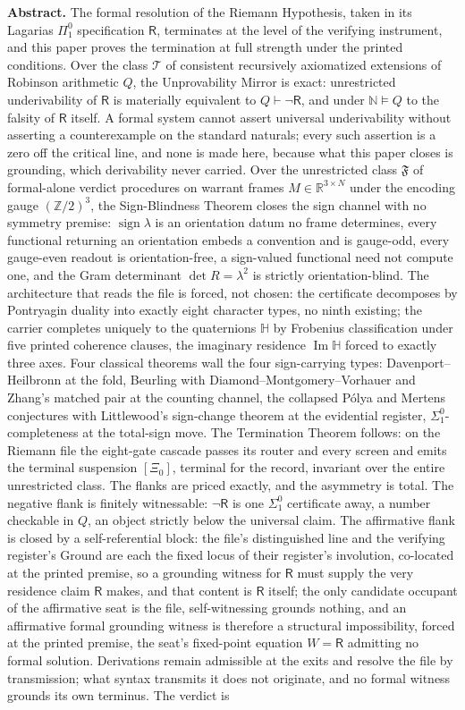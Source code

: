 \documentclass[twocolumn,10pt]{article}
\theoremstyle{plain}
\theoremstyle{definition}
\newcommand{\tXi}{[\Xi_0]}
\newcommand{\R}{\mathsf{R}}
\newcommand{\N}{\mathbb{N}}
\newcommand{\Rl}{\mathbb{R}}
\newcommand{\Hq}{\mathbb{H}}
\newcommand{\Fr}{\mathfrak{F}}
\begin{document}
{\noindent\textbf{Abstract.} The formal resolution of the Riemann Hypothesis, taken in its Lagarias $\Pi^0_1$ specification $\R$, terminates at the level of the verifying instrument, and this paper proves the termination at full strength under the printed conditions. Over the class $\mathcal T$ of consistent recursively axiomatized extensions of Robinson arithmetic $Q$, the Unprovability Mirror is exact: unrestricted underivability of $\R$ is materially equivalent to $Q\vdash\neg\R$, and under $\N\models Q$ to the falsity of $\R$ itself. A formal system cannot assert universal underivability without asserting a counterexample on the standard naturals; every such assertion is a zero off the critical line, and none is made here, because what this paper closes is grounding, which derivability never carried. Over the unrestricted class $\Fr$ of formal-alone verdict procedures on warrant frames $M\in\Rl^{3\times N}$ under the encoding gauge $(\mathbb Z/2)^3$, the Sign-Blindness Theorem closes the sign channel with no symmetry premise: $\operatorname{sign}\lambda$ is an orientation datum no frame determines, every functional returning an orientation embeds a convention and is gauge-odd, every gauge-even readout is orientation-free, a sign-valued functional need not compute one, and the Gram determinant $\det R=\lambda^2$ is strictly orientation-blind. The architecture that reads the file is forced, not chosen: the certificate decomposes by Pontryagin duality into exactly eight character types, no ninth existing; the carrier completes uniquely to the quaternions $\Hq$ by Frobenius classification under five printed coherence clauses, the imaginary residence $\operatorname{Im}\Hq$ forced to exactly three axes. Four classical theorems wall the four sign-carrying types: Davenport--Heilbronn at the fold, Beurling with Diamond--Montgomery--Vorhauer and Zhang's matched pair at the counting channel, the collapsed P\'olya and Mertens conjectures with Littlewood's sign-change theorem at the evidential register, $\Sigma^0_1$-completeness at the total-sign move. The Termination Theorem follows: on the Riemann file the eight-gate cascade passes its router and every screen and emits the terminal suspension $\tXi$, terminal for the record, invariant over the entire unrestricted class. The flanks are priced exactly, and the asymmetry is total. The negative flank is finitely witnessable: $\neg\R$ is one $\Sigma^0_1$ certificate away, a number checkable in $Q$, an object strictly below the universal claim. The affirmative flank is closed by a self-referential block: the file's distinguished line and the verifying register's Ground are each the fixed locus of their register's involution, co-located at the printed premise, so a grounding witness for $\R$ must supply the very residence claim $\R$ makes, and that content is $\R$ itself; the only candidate occupant of the affirmative seat is the file, self-witnessing grounds nothing, and an affirmative formal grounding witness is therefore a structural impossibility, forced at the printed premise, the seat's fixed-point equation $W=\R$ admitting no formal solution. Derivations remain admissible at the exits and resolve the file by transmission; what syntax transmits it does not originate, and no formal witness grounds its own terminus. The verdict is }
\end{document}

